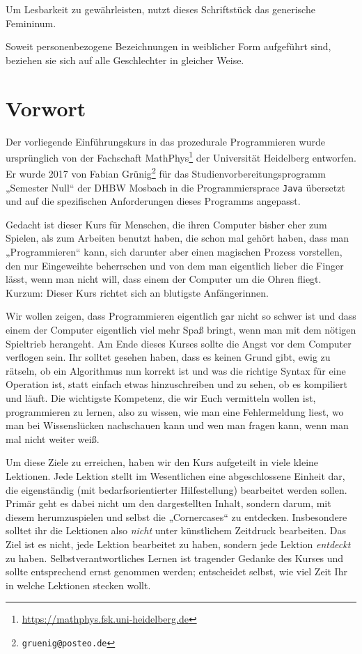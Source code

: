 \documentclass{vorkurs}
\newcommand{\swname}[1]{\texttt{#1}\xspace}
\newcommand{\Java}{\swname{Java}}
\begin{document}
Um Lesbarkeit zu gewährleisten, nutzt dieses Schriftstück das generische
Femininum.

Soweit personenbezogene Bezeichnungen in weiblicher Form aufgeführt sind,
beziehen sie sich auf alle Geschlechter in gleicher Weise.

\clearpage

\chapter*{Vorwort}
\pagestyle{empty}

Der vorliegende Einführungskurs in das prozedurale Programmieren wurde
ursprünglich von der Fachschaft
MathPhys\footnote{\url{https://mathphys.fsk.uni-heidelberg.de}} der Universität
Heidelberg entworfen. Er wurde 2017 von Fabian
Grünig\footnote{\texttt{gruenig@posteo.de}} für das Studienvorbereitungsprogramm
„Semester Null“ der DHBW Mosbach in die Programmiersprace \Java übersetzt und
auf die spezifischen Anforderungen dieses Programms angepasst.

Gedacht ist dieser Kurs für Menschen, die ihren Computer bisher eher zum
Spielen, als zum Arbeiten benutzt haben, die schon mal gehört haben, dass man
„Programmieren“ kann, sich darunter aber einen magischen Prozess vorstellen, den
nur Eingeweihte beherrschen und von dem man eigentlich lieber die Finger lässt,
wenn man nicht will, dass einem der Computer um die Ohren fliegt. Kurzum: Dieser
Kurs richtet sich an blutigste Anfängerinnen.

Wir wollen zeigen, dass Programmieren eigentlich gar nicht so schwer ist und
dass einem der Computer eigentlich viel mehr Spaß bringt, wenn man mit dem
nötigen Spieltrieb herangeht. Am Ende dieses Kurses sollte die Angst vor dem
Computer verflogen sein. Ihr solltet gesehen haben, dass es keinen Grund gibt,
ewig zu rätseln, ob ein Algorithmus nun korrekt ist und was die richtige Syntax
für eine Operation ist, statt einfach etwas hinzuschreiben und zu sehen, ob es
kompiliert und läuft. Die wichtigste Kompetenz, die wir Euch vermitteln wollen
ist, programmieren zu lernen, also zu wissen, wie man eine Fehlermeldung liest,
wo man bei Wissenslücken nachschauen kann und wen man fragen kann, wenn man mal
nicht weiter weiß.

Um diese Ziele zu erreichen, haben wir den Kurs aufgeteilt in viele kleine
Lektionen. Jede Lektion stellt im Wesentlichen eine abgeschlossene Einheit dar,
die eigenständig (mit bedarfsorientierter Hilfestellung) bearbeitet werden
sollen. Primär geht es dabei nicht um den dargestellten Inhalt, sondern darum,
mit diesem herumzuspielen und selbst die „Cornercases“ zu entdecken.
Insbesondere solltet ihr die Lektionen also \emph{nicht} unter künstlichem
Zeitdruck bearbeiten. Das Ziel ist es nicht, jede Lektion bearbeitet zu haben,
sondern jede Lektion \emph{entdeckt} zu haben. Selbstverantwortliches Lernen ist
tragender Gedanke des Kurses und sollte entsprechend ernst genommen werden;
entscheidet selbst, wie viel Zeit Ihr in welche Lektionen stecken wollt.
\end{document}

